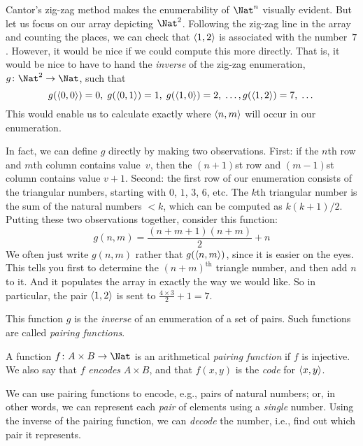 \documentclass[../../../include/open-logic-section]{subfiles}
\begin{document}

\begin{explain}
Cantor's zig-zag method makes the enumerability of $\Nat^n$ visually
evident. But let us focus on our array depicting $\Nat^2$. Following
the zig-zag line in the array and counting the places, we can check
that $\langle 1,2 \rangle$ is associated with the number~$7$. However, it would
be nice if we could compute this more directly. That is, it would be
nice to have to hand the \emph{inverse} of the zig-zag enumeration,
$g\colon \Nat^2 \to \Nat$, such that
\[
g(\langle 0,0 \rangle) = 0, \;
g(\langle 0,1 \rangle) = 1, \;
g(\langle 1,0 \rangle) = 2, \; \dots,  
g(\langle 1,2 \rangle) = 7, \; \dots
\]
This would enable us to calculate exactly where $\langle n, m \rangle$ will occur
in our enumeration. 

In fact, we can define $g$ directly by making two observations. First:
if the $n$th row and $m$th column contains value~$v$, then the
$(n+1)$st row and $(m-1)$st column contains value $v + 1$. Second: the
first row of our enumeration consists of the triangular numbers,
starting with $0$, $1$, $3$, $6$, etc. The $k$th triangular number is
the sum of the natural numbers $< k$, which can be computed as
$k(k+1)/2$. Putting these two observations together, consider this
function:
\[
  g(n,m) = \frac{(n+m+1)(n+m)}{2} + n
\]
We often just write $g(n, m)$ rather that $g(\langle n, m \rangle)$, since it
is easier on the eyes. This tells you first to determine the
$(n+m)^\text{th}$ triangle number, and then add $n$ to it. And
it populates the array in exactly the way we would like. So in
particular, the pair $\langle 1, 2 \rangle$ is sent to $\frac{4 \times 3}{2} +
1 = 7$. 

This function $g$ is the \emph{inverse} of an enumeration of a set of
pairs. Such functions are called \emph{pairing functions}.
\end{explain}

\begin{defn} 
  A function $f\colon A \times B \to \Nat$ is an arithmetical
  \emph{pairing function} if $f$ is injective. We also say that $f$
  \emph{encodes} $A \times B$, and that $f(x,y)$ is the
  \emph{code} for $\langle x,y \rangle$.
\end{defn}

\begin{explain}
We can use pairing functions to encode, e.g., pairs of natural numbers;
or, in other words, we can represent each \emph{pair} of elements
using a \emph{single} number. Using the inverse of the pairing
function, we can \emph{decode} the number, i.e., find out which
pair it represents.
\end{explain}
\end{document}
